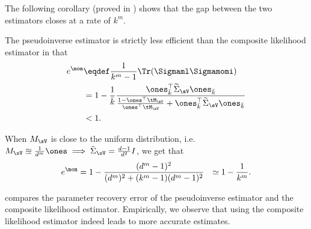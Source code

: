 The following corollary (proved in ) shows that
the gap between the two estimators closes at a rate of $k^m$.
\begin{corollary}
  \label{cor:efficiency}
The pseudoinverse estimator is strictly less efficient
than the composite likelihood estimator in that 
\begin{align*}
e^\mom &\eqdef 
    \frac{1}{k^m-1} \Tr(\Sigmaml\Sigmamomi ) \\
        &= 1 - \frac{1}{\bar k} \frac{ \ones_{\bar k}^\top \widetilde\Sigma_\sV \ones_{\bar k}}{\frac{1 - \ones^\top \tM_\sV}{\ones^\top \tM_\sV} + \ones_{\bar k}^\top \widetilde\Sigma_\sV \ones_{\bar k}} \\
    &< 1.
\end{align*}

When $M_\sV$ is close to the uniform distribution, i.e. $M_\sV \approxeq \frac{1}{d^m} \ones \implies \tilde\Sigma_\sV = \frac{d-1}{d^2} I$, we get that 
\begin{align*}
e^\mom 
    &= 1 - \frac{(d^m -1)^2}{ (d^m)^2 + (k^m-1)(d^m -1)^2} 
    &\simeq 1 - \frac{1}{k^m}.
\end{align*}
\end{corollary}

 compares the parameter recovery error of the
  pseudoinverse estimator and the composite likelihood estimator.
Empirically, we observe that using the composite likelihood estimator
indeed leads to more accurate estimates.


